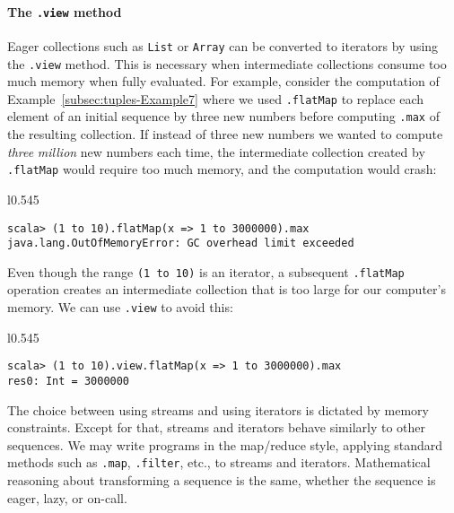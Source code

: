 \paragraph{The \texttt{.view} method}

Eager collections such as \lstinline!List! or \lstinline!Array!
can be converted to iterators by using the \lstinline!.view! method.
This is necessary when intermediate collections consume too much memory
when fully evaluated. For example, consider the computation of Example~\ref{subsec:tuples-Example7}
where we used \lstinline!.flatMap! to replace each element of an
initial sequence by three new numbers before computing \lstinline!.max!
of the resulting collection. If instead of three new numbers we wanted
to compute \emph{three} \emph{million} new numbers each time, the
intermediate collection created by \lstinline!.flatMap! would require
too much memory, and the computation would crash:

\begin{wrapfigure}{l}{0.545\columnwidth}%
\vspace{-0.75\baselineskip}
\begin{lstlisting}
scala> (1 to 10).flatMap(x => 1 to 3000000).max
java.lang.OutOfMemoryError: GC overhead limit exceeded
\end{lstlisting}
\vspace{-0.75\baselineskip}
\end{wrapfigure}%

\noindent Even though the range \lstinline!(1 to 10)! is an iterator,
a subsequent \lstinline!.flatMap! operation creates an intermediate
collection that is too large for our computer's memory. We can use
\lstinline!.view! to avoid this:

\begin{wrapfigure}{l}{0.545\columnwidth}%
\vspace{-0.75\baselineskip}
\begin{lstlisting}
scala> (1 to 10).view.flatMap(x => 1 to 3000000).max
res0: Int = 3000000
\end{lstlisting}
\vspace{-0.75\baselineskip}
\end{wrapfigure}%

\noindent The choice between using streams and using iterators is
dictated by memory constraints. Except for that, streams and iterators
behave similarly to other sequences. We may write programs in the
map/reduce style, applying standard methods such as \lstinline!.map!,
\lstinline!.filter!, etc., to streams and iterators. Mathematical
reasoning about transforming a sequence is the same, whether the sequence
is eager, lazy, or on-call.

